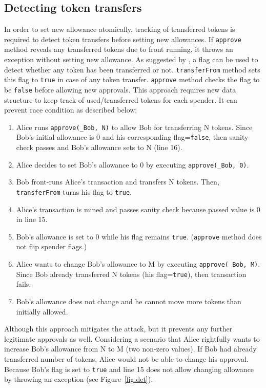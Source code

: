 \subsection{Detecting token transfers}
In order to set new allowance atomically, tracking of transferred tokens is required to detect token transfers before setting new allowances. If \texttt{approve} method reveals any transferred tokens due to front running, it throws an exception without setting new allowance. As suggested by \cite{Ref17}, a flag can be used to detect whether any token has been transferred or not. \texttt{transferFrom} method sets this flag to \texttt{true} in case of any token transfer. \texttt{approve} method checks the flag to be \texttt{false} before allowing new approvals. This approach requires new data structure to keep track of used/transferred tokens for each spender. It can prevent race condition as described below:
\begin{enumerate}
	\item Alice runs \texttt{approve(\_Bob, N)} to allow Bob for transferring N tokens. Since Bob’s initial allowance is 0 and his corresponding flag=\texttt{false}, then sanity check passes and Bob’s allowance sets to N (line 16).
	\item Alice decides to set Bob’s allowance to 0 by executing \texttt{approve(\_Bob, 0)}.
	\item Bob front-runs Alice’s transaction and transfers N tokens. Then, \texttt{transferFrom} turns his flag to \texttt{true}.
	\item Alice’s transaction is mined and passes sanity check because passed value is 0 in line 15.
	\item Bob’s allowance is set to 0 while his flag remains \texttt{true}. (\texttt{approve} method does not flip spender flags.)
	\item Alice wants to change Bob’s allowance to M by executing \texttt{approve(\_Bob, M)}. Since Bob already transferred N tokens (his flag=\texttt{true}), then transaction fails.
	\item Bob’s allowance does not change and he cannot move more tokens than initially allowed.
\end{enumerate}
\noindent Although this approach mitigates the attack, but it prevents any further legitimate approvals as well. Considering a scenario that Alice rightfully wants to increase Bob’s allowance from N to M (two non-zero values). If Bob had already transferred number of tokens, Alice would not be able to change his approval. Because Bob's flag is set to \texttt{true} and line 15 does not allow changing allowance by throwing an exception (see Figure~\ref{fig:det}).
